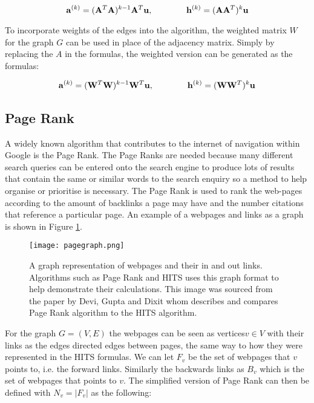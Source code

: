 \begin{equation} \label{eq:nhits}
\bold{a}^{(k)} = (\bold{A}^{T}\bold{A})^{k-1}\bold{A}^{T}\bold{u} , \qquad \qquad \bold{h}^{(k)} = (\bold{A}\bold{A}^{T})^{k}\bold{u}
\end{equation}

To incorporate weights of the edges into the algorithm, the weighted matrix $W$ for the graph $G$ can be used in place of the adjacency matrix. Simply by replacing the $A$ in the formulas, the weighted version can be generated as the formulas:

\begin{equation} \label{eq:nhits}
\bold{a}^{(k)} = (\bold{W}^{T}\bold{W})^{k-1}\bold{W}^{T}\bold{u} , \qquad \qquad \bold{h}^{(k)} = (\bold{W}\bold{W}^{T})^{k}\bold{u}
\end{equation}

\subsection{Page Rank}
A widely known algorithm that contributes to the internet of navigation within Google is the Page Rank. The Page Ranks are needed because many different search queries can be entered onto the search engine to produce lots of results that contain the same or similar words to the search enquiry so a method to help organise or prioritise is necessary. The Page Rank is used to rank the web-pages according to the amount of backlinks a page may have and the number citations that reference a particular page. An example of a webpages and links as a graph is shown in Figure \ref{fig:page}.

\begin{figure}[!htb]
	\centering
	\texttt{[image: pagegraph.png]}
	\caption{A graph representation of webpages and their in and out links. Algorithms such as Page Rank and HITS uses this graph format to help demonstrate their calculations. This image was sourced from the paper by Devi, Gupta and Dixit \cite{devi2014comparative} whom describes and compares Page Rank algorithm to the HITS algorithm.}
	\label{fig:page}
\end{figure}

For the graph $G = (V, E)$ the webpages can be seen as vertices$v \in V$ with their links as the edges directed edges between pages, the same way to how they were represented in the HITS formulas. We can let $F_v$ be the set of webpages that $v$ points to, i.e. the forward links. Similarly the backwards links as $B_v$ which is the set of webpages that points to $v$. The simplified version of Page Rank \cite{page1999pagerank} can then be defined with $N_v = \left|F_v\right|$ as the following:


